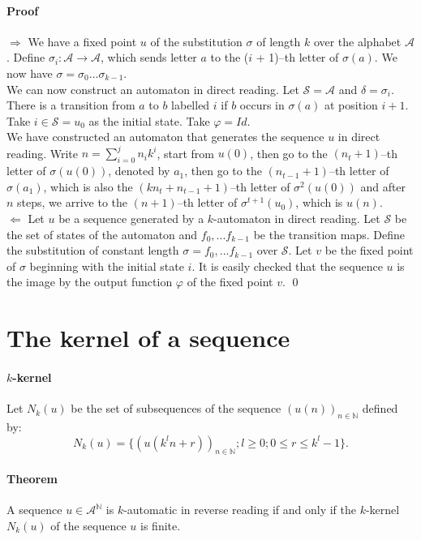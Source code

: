 \documentclass{article}
\begin{document}
\paragraph{Proof}
$\Rightarrow$ We have a fixed point $u$ of the substitution $\sigma$ of length
$k$ over the alphabet $\mathcal{A}$. Define 
$\sigma_i: \mathcal{A} \rightarrow \mathcal{A}$, which sends letter $a$ to the
($i$ + 1)--th letter of $\sigma(a)$. We now have 
$\sigma = \sigma_0 ... \sigma_{k - 1}$.\\
We can now construct an automaton in direct reading. Let $\mathcal{S = A}$ and
$\delta = \sigma_i$. There is a transition from $a$ to $b$ labelled $i$ if $b$ 
occurs in $\sigma(a)$ at position $i + 1$. Take $i \in \mathcal{S} = u_0$ as
the initial state. Take $\varphi = Id$.\\
We have constructed an automaton that generates the sequence $u$ in direct 
reading. Write $n = \sum_{i = 0}^j n_i k^i$, start from $u(0)$, then go to the 
$(n_t + 1)$--th letter of $\sigma(u(0))$, denoted by $a_1$, then go to the 
$(n_{t - 1} + 1)$--th letter of $\sigma(a_1)$, which is also the 
$(kn_t + n_{t - 1} + 1)$--th letter of $\sigma^2(u(0))$ and after $n$ steps, we
arrive to the $(n + 1)$--th letter of $\sigma^{t + 1}(u_0)$, which is $u(n)$.\\
$\Leftarrow$ Let $u$ be a sequence generated by a $k$-automaton in direct 
reading. Let $\mathcal{S}$ be the set of states of the automaton and 
$f_0, ... f_{k - 1}$ be the transition maps. Define the substitution of 
constant length $\sigma = f_0, ... f_{k - 1}$ over $\mathcal{S}$. Let $v$ be
the fixed point of $\sigma$ beginning with the initial state $i$. It is easily
checked that the sequence $u$ is the image by the output function $\varphi$ of
the fixed point $v$. \qed

\section*{The kernel of a sequence}
\paragraph{$k$-kernel} Let $N_k(u)$ be the set of subsequences of the sequence
$(u(n))_{n \in \mathbb{N}}$ defined by:
\begin{displaymath}
N_k(u) = \{(u(k^ln + r))_{n \in \mathbb{N}}; l \ge 0; 0 \le r \le k^l - 1\}.
\end{displaymath}

\paragraph{Theorem} A sequence $u \in \mathcal{A}^\mathbb{N}$ is $k$-automatic 
in reverse reading if and only if the $k$-kernel $N_k(u)$ of the sequence $u$ 
is finite.
\end{document}
